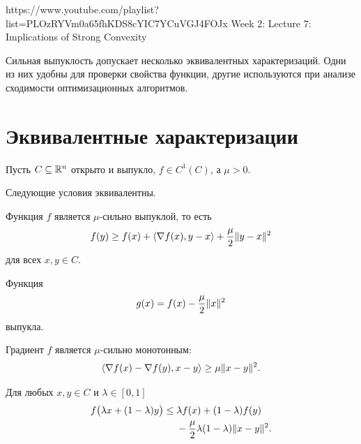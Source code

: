 
\sourcevideo
    {https://www.youtube.com/playlist?list=PLOzRYVm0a65fhKDS8cYIC7YCuVGJ4FOJx}
    {Week 2: Lecture 7: Implications of Strong Convexity}

Сильная выпуклость допускает несколько эквивалентных
характеризаций. Одни из них удобны для проверки свойства функции,
другие используются при анализе сходимости оптимизационных
алгоритмов.

\section{Эквивалентные характеризации}

Пусть \(C\subseteq\mathbb{R}^n\) открыто и выпукло, \(f\in C^1(C)\), а
\(\mu>0\).

\begin{theorem}
Следующие условия эквивалентны.

Функция \(f\) является \(\mu\)-сильно выпуклой, то есть
\[
    f(y)
    \ge
    f(x)
    +
    \left\langle \nabla f(x),y-x \right\rangle
    +
    \frac{\mu}{2}\lVert y-x\rVert^2
\]
для всех \(x,y\in C\).

Функция
\[
    g(x)
    =
    f(x)-\frac{\mu}{2}\lVert x\rVert^2
\]
выпукла.

Градиент \(f\) является \(\mu\)-сильно монотонным:
\[
    \left\langle 
        \nabla f(x)-\nabla f(y)
    ,
        x-y
     \right\rangle
    \ge
    \mu\lVert x-y\rVert^2.
\]

Для любых \(x,y\in C\) и \(\lambda\in[0,1]\)
\[
\begin{aligned}
    f\bigl(\lambda x+(1-\lambda)y\bigr)
    \le{}&
    \lambda f(x)+(1-\lambda)f(y)
    \\
    &-
    \frac{\mu}{2}
    \lambda(1-\lambda)\lVert x-y\rVert^2.
\end{aligned}
\]
\end{theorem}

